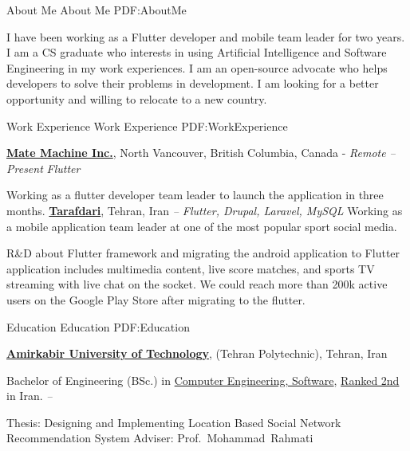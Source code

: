 \documentclass[letterpaper,MMMyyyy,nonstopmode]{resume}
\begin{document}
\begin{Body}



\Section
{About Me}
{About Me}
{PDF:AboutMe}

I have been working as a Flutter developer and mobile team leader for two years.
I am a CS graduate who interests in using Artificial Intelligence and Software Engineering in my work experiences.
I am an open-source advocate who helps developers to solve their problems in development.
I am looking for a better opportunity and willing to relocate to a new country.


\Section
{Work\newline
Experience}
{Work Experience}
{PDF:WorkExperience}

\Entry
\href{https://matemachine.com}
{\textbf{Mate Machine Inc.}},
\small{North Vancouver, British Columbia, Canada - }\textit{\small{Remote}}
\hfill
\textsl{\small{ -- Present}}
\Gap
\small{\textit{Flutter}}

\BulletItem
Working as a flutter developer team leader to launch the application in three months.
\BigGap
\Entry
\href{https://tarafdari.com}
{\textbf{Tarafdari}},
\small{Tehran, Iran}
\hfill
\textsl{\small{ -- }}
\Gap
\small{\textit{Flutter, Drupal, Laravel, MySQL}}
\BulletItem
Working as a mobile application team leader at one of the most popular sport social media.
\hfill
\normalsize{
\href{https://play.google.com/store/apps/details?id=com.tarafdari.news}
{\faAndroid}}
\begin{Detail}
\SubBulletItem
R\&D about Flutter framework and migrating the android application to Flutter
application includes multimedia content,
live score matches, and sports TV streaming with live chat on the socket.
\SubBulletItem
We could reach more than 200k active users on the Google Play Store after migrating to the flutter.
\end{Detail}


\Section
{Education}
{Education}
{PDF:Education}

\Entry
\href{https://aut.ac.ir}
{\textbf{Amirkabir University of Technology}},
\small{(Tehran Polytechnic), Tehran, Iran}

\Gap
\BulletItem
Bachelor of Engineering (BSc.) in
\href{https://ce.aut.ac.ir/en}
{Computer Engineering, Software},
\href{https://ur.isc.gov.ir/#Technology}
{Ranked 2nd}
in Iran.
\hfill
\textsl{\small{ -- }}
\begin{Detail}
\SubBulletItem
Thesis:
Designing and Implementing Location Based Social Network
Recommendation System
\SubBulletItem
Adviser:
Prof.~Mohammad~Rahmati
\end{Detail}


\end{Body}
\end{document}
